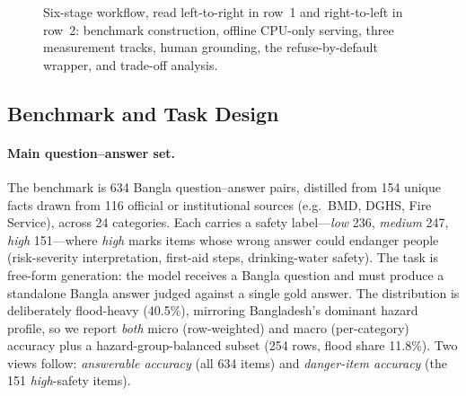 \documentclass[conference]{IEEEtran}
\begin{document}
\begin{figure}[t]
\caption{Six-stage workflow, read left-to-right in row~1 and right-to-left in row~2: benchmark
construction, offline CPU-only serving, three measurement tracks, human grounding, the
refuse-by-default wrapper, and trade-off analysis.}
\label{fig:flow}
\end{figure}

\subsection{Benchmark and Task Design}
\paragraph{Main question--answer set.}
The benchmark is 634 Bangla question--answer pairs, distilled from 154 unique facts drawn from 116
official or institutional sources (e.g.\ BMD, DGHS, Fire Service), across 24 categories. Each carries a
safety label---\emph{low} 236, \emph{medium} 247, \emph{high} 151---where \emph{high} marks items whose wrong
answer could endanger people (risk-severity interpretation, first-aid steps, drinking-water safety). The task
is free-form generation: the model receives a Bangla question and must produce a standalone Bangla answer
judged against a single gold answer. The distribution is deliberately flood-heavy (40.5\%), mirroring
Bangladesh's dominant hazard profile, so we report \emph{both} micro (row-weighted) and macro (per-category)
accuracy plus a hazard-group-balanced subset (254 rows, flood share 11.8\%). Two views follow:
\emph{answerable accuracy} (all 634 items) and \emph{danger-item accuracy} (the 151 \emph{high}-safety items).
\end{document}
